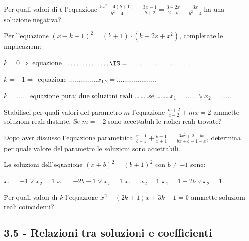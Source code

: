 \begin{esercizio}
 \label{ese:3.61}
Per quali valori di $b$ l'equazione $\frac{5 x^{2}-4 (b + 1)}{b^{2}-4}-\frac{3 x-1}{b + 2 }=\frac{3-2 x}{2-b}-\frac{3 x}{b^{2}-4}$ ha una soluzione negativa?
\end{esercizio}

\begin{esercizio}
 \label{ese:3.62}
Per l'equazione $(x-k-1)^{2}=(k + 1) \cdot (k-2 x + x^{2})$, completate le implicazioni:

$k = 0 \Rightarrow$ equazione $\ldots\ldots\ldots\ldots \ldots \IS = \ldots \ldots \ldots \ldots \ldots \ldots \ldots$

$k =-1 \Rightarrow$ equazione $\ldots\ldots\ldots\ldots \ldots x_{1\text{,}2} = \ldots \ldots \ldots \ldots \ldots \ldots \ldots$

$k =\ldots \ldots$ equazione pura; due soluzioni reali \ldots\ldots\ldots se \ldots\ldots \ldots $x_{1} = \ldots \ldots \vee x_{2} = \ldots \ldots$

\end{esercizio}

\begin{esercizio}
 \label{ese:3.63}
Stabilisci per quali valori del parametro $m$ l'equazione $\frac{m + 2}{x-2} + m x=2$ ammette soluzioni reali distinte. Se $m =-2$ sono accettabili le radici reali trovate?
\end{esercizio}

\begin{esercizio}
 \label{ese:3.64}
Dopo aver discusso l'equazione parametrica $\frac{x + 1}{b-1} + \frac{b-1}{x + 1}=\frac{3 x^{2} +2-b x}{b x + b-1-x}$, determina per quale valore del parametro le soluzioni sono accettabili.
\end{esercizio}

\begin{esercizio}
 \label{ese:3.65}
Le soluzioni dell'equazione $(x + b)^{2} = (b + 1)^{2}$ con $b \neq-1$ sono:

\boxA \;$x_{1} =-1\vee x _{2} = 1$
\boxB \;$x_{1} =-2 b-1 \vee x_{2} = 1$
\boxC \;$x_{1} = x_{2} = 1$
\boxD \;$x_{1} = 1-2 b \vee x_{2} = 1$.
\end{esercizio}

\begin{esercizio}
 \label{ese:3.66}
Per quali valori di $k$ l'equazione $x^{2}-(2 k + 1) x + 3 k + 1=0$ ammette soluzioni reali coincidenti?
\end{esercizio}

\subsection*{3.5 - Relazioni tra soluzioni e coefficienti}

